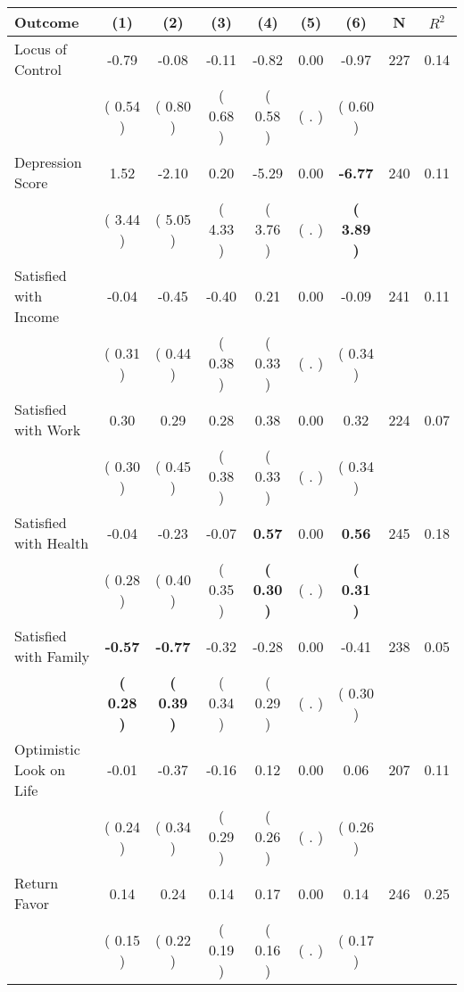 \begin{tabular}{lcccccccc}
\toprule
 \textbf{Outcome} & \textbf{(1)} & \textbf{(2)} & \textbf{(3)} & \textbf{(4)} & \textbf{(5)} & \textbf{(6)} & \textbf{N} & \textbf{$ R^2$} \\
\midrule
Locus of Control &     -0.79 &     -0.08 &     -0.11 &     -0.82 &      0.00 &     -0.97 & 227 &       0.14 \\ 
 & (     0.54 ) & (     0.80 ) & (     0.68 ) & (     0.58 ) & (        . ) & (     0.60 ) & \\
Depression Score &      1.52 &     -2.10 &      0.20 &     -5.29 &      0.00 & \textbf{    -6.77} & 240 &       0.11 \\ 
 & (     3.44 ) & (     5.05 ) & (     4.33 ) & (     3.76 ) & (        . ) & \textbf{(     3.89 )} & \\
Satisfied with Income &     -0.04 &     -0.45 &     -0.40 &      0.21 &      0.00 &     -0.09 & 241 &       0.11 \\ 
 & (     0.31 ) & (     0.44 ) & (     0.38 ) & (     0.33 ) & (        . ) & (     0.34 ) & \\
Satisfied with Work &      0.30 &      0.29 &      0.28 &      0.38 &      0.00 &      0.32 & 224 &       0.07 \\ 
 & (     0.30 ) & (     0.45 ) & (     0.38 ) & (     0.33 ) & (        . ) & (     0.34 ) & \\
Satisfied with Health &     -0.04 &     -0.23 &     -0.07 & \textbf{     0.57} &      0.00 & \textbf{     0.56} & 245 &       0.18 \\ 
 & (     0.28 ) & (     0.40 ) & (     0.35 ) & \textbf{(     0.30 )} & (        . ) & \textbf{(     0.31 )} & \\
Satisfied with Family & \textbf{    -0.57} & \textbf{    -0.77} &     -0.32 &     -0.28 &      0.00 &     -0.41 & 238 &       0.05 \\ 
 & \textbf{(     0.28 )} & \textbf{(     0.39 )} & (     0.34 ) & (     0.29 ) & (        . ) & (     0.30 ) & \\
Optimistic Look on Life &     -0.01 &     -0.37 &     -0.16 &      0.12 &      0.00 &      0.06 & 207 &       0.11 \\ 
 & (     0.24 ) & (     0.34 ) & (     0.29 ) & (     0.26 ) & (        . ) & (     0.26 ) & \\
Return Favor &      0.14 &      0.24 &      0.14 &      0.17 &      0.00 &      0.14 & 246 &       0.25 \\ 
 & (     0.15 ) & (     0.22 ) & (     0.19 ) & (     0.16 ) & (        . ) & (     0.17 ) & \\

\end{tabular}
